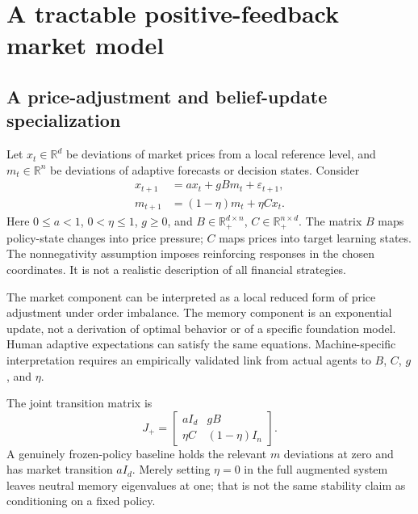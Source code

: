 \documentclass[11pt,a4paper]{article}
\theoremstyle{definition}
\theoremstyle{remark}
\newcommand{\R}{\mathbb{R}}
\begin{document}
\section{A tractable positive-feedback market model}
\label{sec:positive}
\subsection{A price-adjustment and belief-update specialization}
Let $x_t\in\R^d$ be deviations of market prices from a local reference level, and $m_t\in\R^n$ be deviations of adaptive forecasts or decision states. Consider
\begin{align}
 x_{t+1}&=a x_t+gB m_t+\varepsilon_{t+1},\label{eq:positiveprice}\\
 m_{t+1}&=(1-\eta)m_t+\eta C x_t.\label{eq:positivememory}
\end{align}
Here $0\leq a<1$, $0<\eta\leq1$, $g\geq0$, and $B\in\R_+^{d\times n}$, $C\in\R_+^{n\times d}$. The matrix $B$ maps policy-state changes into price pressure; $C$ maps prices into target learning states. The nonnegativity assumption imposes reinforcing responses in the chosen coordinates. It is not a realistic description of all financial strategies.

The market component can be interpreted as a local reduced form of price adjustment under order imbalance. The memory component is an exponential update, not a derivation of optimal behavior or of a specific foundation model. Human adaptive expectations can satisfy the same equations. Machine-specific interpretation requires an empirically validated link from actual agents to $B$, $C$, $g$, and $\eta$.

The joint transition matrix is
\begin{equation}
 J_+=\begin{bmatrix}aI_d&gB\\\eta C&(1-\eta)I_n\end{bmatrix}.
 \label{eq:Jpositive}
\end{equation}
A genuinely frozen-policy baseline holds the relevant $m$ deviations at zero and has market transition $aI_d$. Merely setting $\eta=0$ in the full augmented system leaves neutral memory eigenvalues at one; that is not the same stability claim as conditioning on a fixed policy.
\end{document}
